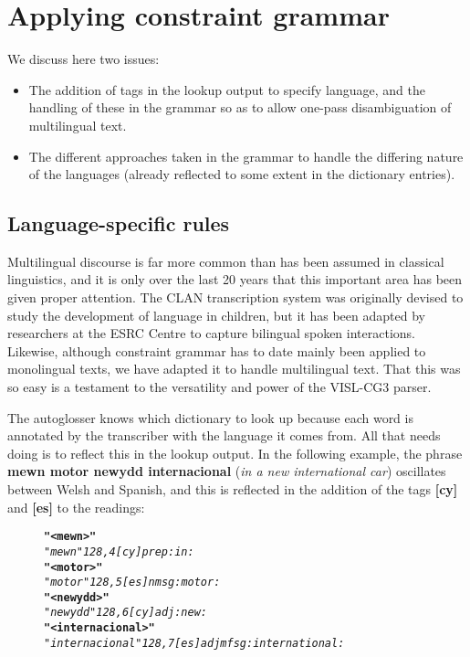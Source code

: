 \documentclass[11pt]{article}
\begin{document}
\section{Applying constraint grammar}
\label{sec:constraint}

We discuss here two issues:
\begin{itemize}
\item The addition of tags in the lookup output to specify language, and the handling of these in the grammar so as to allow one-pass disambiguation of multilingual text.
\item The different approaches taken in the grammar to handle the differing nature of the languages (already reflected to some extent in the dictionary entries).
\end{itemize}

\subsection{Language-specific rules}
\label{sec:langspec}

Multilingual discourse is far more common than has been assumed in classical linguistics, and it is only over the last 20 years that this important area has been given proper attention.  The CLAN transcription system was originally devised to study the development of language in children, but it has been adapted by researchers at the ESRC Centre to capture bilingual spoken interactions.  Likewise, although constraint grammar has to date mainly been applied to monolingual texts, we have adapted it to handle multilingual text.  That this was so easy is a testament to the versatility and power of the VISL-CG3 parser.

The autoglosser knows which dictionary to look up because each word is annotated by the transcriber with the language it comes from.  All that needs doing is to reflect this in the lookup output.  In the following example, the phrase \textbf{mewn motor newydd internacional} (\textit{in a new international car}) oscillates between Welsh and Spanish, and this is reflected in the addition of the tags \textbf{[cy]} and \textbf{[es]} to the readings:

\begin{figure}[h]
\vspace{-10pt}
\begin{alltt}
\normalfont
\textbf{"<mewn>"}
    \textit{"mewn" {128,4} [cy] prep :in:}
\textbf{"<motor>"}
    \textit{"motor" {128,5} [es] n m sg :motor:}
\textbf{"<newydd>"}
    \textit{"newydd" {128,6} [cy] adj :new:}
\textbf{"<internacional>"}
    \textit{"internacional" {128,7} [es] adj mf sg :internat\-ional:}
\end{alltt}
\vspace{-10pt}
\end{figure}
\end{document}
